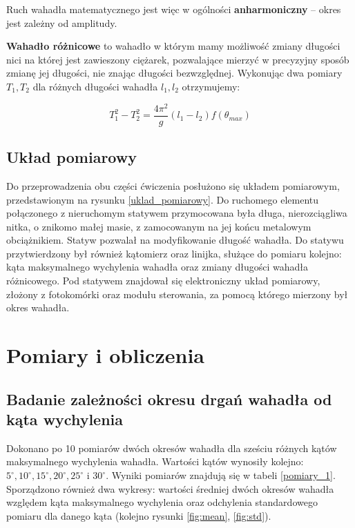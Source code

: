 \documentclass[a4paper]{article}
\newlength{\du}
\begin{document}
Ruch wahadła matematycznego jest więc w ogólności \textbf{anharmoniczny} -- okres
jest zależny od amplitudy.

\textbf{Wahadło różnicowe} to wahadło w którym mamy możliwość zmiany długości nici na której 
jest zawieszony ciężarek, pozwalające
mierzyć w precyzyjny sposób zmianę jej długości, nie znając długości bezwzględnej. Wykonując dwa pomiary $T_1, T_2$ dla różnych długości wahadła $l_1, l_2$ otrzymujemy:

\[ T^2_1 - T^2_2 = \frac{4\pi ^2}{g}\left(l_1-l_2\right) f(\theta_{max}) \]

\subsection{Układ pomiarowy}
Do przeprowadzenia obu części ćwiczenia posłużono się układem pomiarowym,
przedstawionym na rysunku \ref{uklad_pomiarowy}. Do ruchomego elementu 
połączonego z nieruchomym statywem przymocowana była długa, nierozciągliwa nitka, 
o znikomo małej masie, z zamocowanym na jej końcu metalowym obciążnikiem. 
Statyw pozwalał na modyfikowanie długość wahadła. Do statywu 
przytwierdzony był również kątomierz oraz linijka, służące do pomiaru kolejno:
kąta maksymalnego wychylenia wahadła oraz zmiany długości wahadła różnicowego.
Pod statywem znajdował się elektroniczny układ pomiarowy, złożony z fotokomórki
oraz modułu sterowania, za pomocą którego mierzony był okres wahadła.




\section{Pomiary i obliczenia}
\subsection{Badanie zależności okresu drgań wahadła od kąta wychylenia}

Dokonano po 10 pomiarów dwóch okresów wahadła dla sześciu różnych kątów maksymalnego wychylenia wahadła. 
Wartości kątów wynosiły kolejno:
$5^\circ, 10^\circ, 15^\circ, 20^\circ, 25^\circ$ i $30^\circ$. 
Wyniki pomiarów znajdują się w tabeli \ref{pomiary_1}. Sporządzono również dwa wykresy: 
wartości średniej dwóch okresów wahadła względem kąta maksymalnego wychylenia oraz 
odchylenia standardowego pomiaru dla danego kąta (kolejno rysunki \ref{fig:mean}, \ref{fig:std}).
\end{document}

